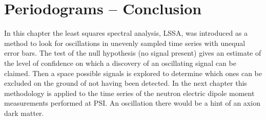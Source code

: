 \section*{Periodograms -- Conclusion}
In this chapter the least squares spectral analysis, LSSA, was introduced as a method to look for oscillations in unevenly sampled time series with unequal error bars. The test of the null hypothesis (no signal present) gives an estimate of the level of confidence on which a discovery of an oscillating signal can be claimed. Then a space possible signals is explored to determine which ones can be excluded on the ground of not having been detected. In the next chapter this methodology is applied to the time series of the neutron electric dipole moment measurements performed at PSI\@. An oscillation there would be a hint of an axion dark matter.
